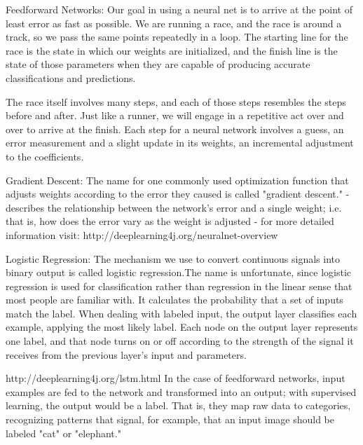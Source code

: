 {Feedforward Networks: Our goal in using a neural net is to arrive at the point of least error as fast as possible. We are running a race, and the race is around a track, so we pass the same points repeatedly in a loop. The starting line for the race is the state in which our weights are initialized, and the finish line is the state of those parameters when they are capable of producing accurate classifications and predictions.

The race itself involves many steps, and each of those steps resembles the steps before and after. Just like a runner, we will engage in a repetitive act over and over to arrive at the finish. Each step for a neural network involves a guess, an error measurement and a slight update in its weights, an incremental adjustment to the coefficients.

Gradient Descent: The name for one commonly used optimization function that adjusts weights according to the error they caused is called "gradient descent."
- describes the relationship between the network’s error and a single weight; i.e. that is, how does the error vary as the weight is adjusted
- for more detailed information visit: http://deeplearning4j.org/neuralnet-overview

Logistic Regression: The mechanism we use to convert continuous signals into binary output is called logistic regression.The name is unfortunate, since logistic regression is used for classification rather than regression in the linear sense that most people are familiar with. It calculates the probability that a set of inputs match the label.
When dealing with labeled input, the output layer classifies each example, applying the most likely label. Each node on the output layer represents one label, and that node turns on or off according to the strength of the signal it receives from the previous layer’s input and parameters.


http://deeplearning4j.org/lstm.html
In the case of feedforward networks, input examples are fed to the network and transformed into an output; with supervised learning, the output would be a label. That is, they map raw data to categories, recognizing patterns that signal, for example, that an input image should be labeled "cat" or "elephant."

}
